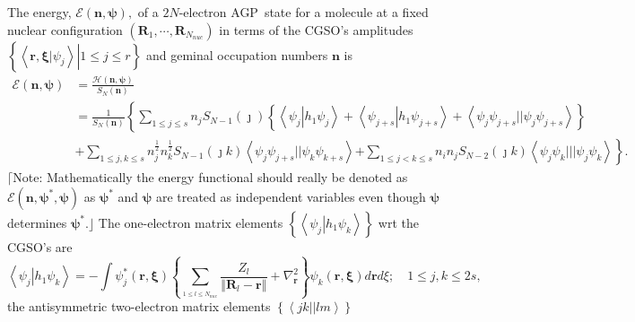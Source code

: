\documentclass[aps,preprint]{revtex4}%
\begin{document}
The energy, $\mathcal{E}\left(  \mathbf{n,\psi}\right)  ,$ of a $2N$-electron
AGP\ state for a molecule at a fixed nuclear configuration $\left(
\mathbf{R}_{1},\cdots,\mathbf{R}_{N_{nuc}}\right)  $ in terms of the CGSO's
amplitudes $\left\{  \left.  \left\langle \left.  \mathbf{r,\xi}\right\vert
\psi_{j}\right\rangle \right\vert 1\leq j\leq r\right\}  $ and geminal
occupation numbers $\mathbf{n}$ is
\begin{align}
\mathcal{E}\left(  \mathbf{n,\psi}\right)   &  =\frac{\mathcal{H}\left(
\mathbf{n,\psi}\right)  }{S_{N}\left(  \mathbf{n}\right)  }\nonumber\\
&  =\frac{1}{S_{N}\left(  \mathbf{n}\right)  }\left\{  \sum_{1\leq j\leq
s}n_{j}S_{N-1}\left(  \jmath\right)  \left\{  \left\langle \psi_{j}\left\vert
h_{1}\psi_{j}\right.  \right\rangle +\left\langle \psi_{j+s}\left\vert
h_{1}\psi_{j+s}\right.  \right\rangle +\left\langle \psi_{j}\psi_{j+s}%
||\psi_{j}\psi_{j+s}\right\rangle \right\}  \right. \nonumber\\
&  +\sum_{1\leq j,k\leq s}n_{j}^{\frac{1}{2}}n_{k}^{\frac{1}{2}}S_{N-1}\left(
\jmath k\right)  \left\langle \psi_{j}\psi_{j+s}||\psi_{k}\psi_{k+s}%
\right\rangle \left.  +\sum_{1\leq j<k\leq s}n_{i}n_{j}S_{N-2}\left(  \jmath
k\right)  \left\langle \psi_{j}\psi_{k}|||\psi_{j}\psi_{k}\right\rangle
\right\}  . \label{energy}%
\end{align}
$\lceil$Note: Mathematically the energy functional should really be denoted as
$\mathcal{E}\left(  \mathbf{n,\psi}^{\ast}\mathbf{,\psi}\right)  $ as
$\mathbf{\psi}^{\ast}$ and $\mathbf{\psi}$ are treated as independent
variables even though $\mathbf{\psi}$ determines $\mathbf{\psi}^{\ast}%
$.$\rfloor$ The one-electron matrix elements $\left\{  \left\langle \psi
_{j}\left\vert h_{1}\psi_{k}\right.  \right\rangle \right\}  $ wrt the CGSO's
are
\begin{equation}
\left\langle \psi_{j}\left\vert h_{1}\psi_{k}\right.  \right\rangle =-\int
\psi_{j}^{\ast}\left(  \mathbf{r,\xi}\right)  \left\{  \sum_{_{1\leq l\leq
N_{nuc}}}\frac{Z_{l}}{\left\Vert \mathbf{R}_{l}-\mathbf{r}\right\Vert }%
+\nabla_{\mathbf{r}}^{2}\right\}  \psi_{k}\left(  \mathbf{r,\xi}\right)
d\mathbf{r}d\xi;\quad1\leq j,k\leq2s, \label{h1}%
\end{equation}
the antisymmetric two-electron matrix elements $\left\{  \left\langle
jk||lm\right\rangle \right\}  $
\end{document}
